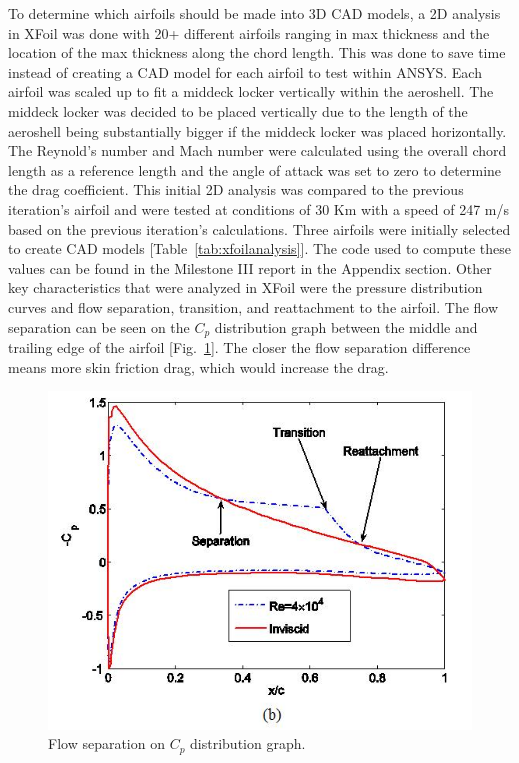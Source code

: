 \indent\indent To determine which airfoils should be made into 3D CAD models, a 2D analysis in XFoil was done with 20+ different airfoils ranging in max thickness and the location of the max thickness along the chord length. This was done to save time instead of creating a CAD model for each airfoil to test within ANSYS. Each airfoil was scaled up to fit a middeck locker vertically within the aeroshell. The middeck locker was decided to be placed vertically due to the length of the aeroshell being substantially bigger if the middeck locker was placed horizontally. The Reynold's number and Mach number were calculated using the overall chord length as a reference length and the angle of attack was set to zero to determine the drag coefficient. This initial 2D analysis was compared to the previous iteration's airfoil and were tested at conditions of 30 Km with a speed of 247 m/s based on the previous iteration's calculations. Three airfoils were initially selected to create CAD models [Table~\ref{tab:xfoilanalysis}]. The code used to compute these values can be found in the Milestone III report in the Appendix section. Other key characteristics that were analyzed in XFoil were the pressure distribution curves and flow separation, transition, and reattachment to the airfoil. The flow separation can be seen on the $C_p$ distribution graph between the middle and trailing edge of the airfoil [Fig.~\ref{fig:flowseparation}]. The closer the flow separation difference means more skin friction drag, which would increase the drag.

\begin{figure}[ht]
  \centering
  \includegraphics[width=.5\textwidth]{Aeroshell/flowseparation.png}
  \caption{\label{fig:flowseparation}Flow separation on $C_p$ distribution graph.}
\end{figure}

